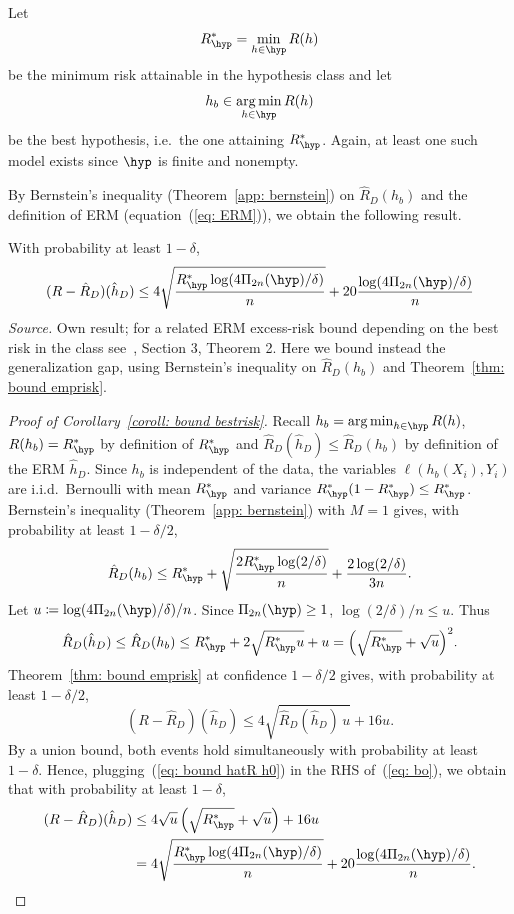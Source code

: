 \documentclass[reqno]{amsart}
\begin{document}
Let
\[
R^*_\hyp = \min_{h\in\hyp} R(h)
\]
be the minimum risk attainable in the hypothesis class
and let \[
h_b \in \argmin_{h\in\hyp} R(h)
\]
be the best hypothesis, i.e.\ the one attaining $R^*_\hyp$. Again, at least one such model exists since $\hyp$ is finite and nonempty. 

By Bernstein's inequality (Theorem~\ref{app: bernstein}) on $\hat R_D(h_b)$ and the definition of ERM (equation~(\ref{eq: ERM})), we obtain the following result. 

\begin{corollary}\label{coroll: bound bestrisk}
    With probability at least $1-\delta$,
    \[
    (R - \hat R_D)(\hat h_D) \le 4\sqrt{\frac{R^*_{\hyp}\log(4\Pi_{2n}(\hyp)/\delta)}{n}} + 20\frac{\log(4\Pi_{2n}(\hyp)/\delta)}{n}
    \]
\textnormal{\emph{Source.} Own result; for a related ERM excess-risk bound depending on the best risk in the class see~\cite{bartlett1999inequality}, Section 3, Theorem 2. Here we bound instead the generalization gap, using Bernstein's inequality on $\hat R_D(h_b)$ and Theorem~\ref{thm: bound emprisk}.}

\begin{proof}[Proof of Corollary~\ref{coroll: bound bestrisk}]
        Recall $h_b = \argmin_{h\in\hyp} R(h)$, $R(h_b) = R^*_{\hyp}$ by definition of $R^*_\hyp$ and $\hat R_D(\hat h_D) \le \hat R_D(h_b)$ by definition of the ERM $\hat h_D$.
        Since $h_b$ is independent of the data, the variables $\ell(h_b(X_i),Y_i)$ are i.i.d.\ Bernoulli with mean $R^*_\hyp$ and variance $R^*_\hyp(1-R^*_\hyp) \le R^*_\hyp$. Bernstein's inequality (Theorem~\ref{app: bernstein}) with $M=1$ gives, with probability at least $1-\delta/2$,
        \[
        \hat R_D(h_b) \le R^*_{\hyp} + \sqrt{\frac{2R^*_\hyp \log (2/\delta)}{n}} + \frac{2\log(2/\delta)}{3n}.
        \]
        Let $u\coloneq\log(4\Pi_{2n}(\hyp)/\delta)/n$. Since $\Pi_{2n}(\hyp)\ge 1$, $\log(2/\delta)/n\le u$. Thus
        \begin{equation}\label{eq: bound hatR h0}
        \hat R_D(\hat h_D) \le \hat R_D(h_b) \le R^*_\hyp + 2\sqrt{R^*_\hyp u} + u = {\left(\sqrt{R^*_\hyp} + \sqrt{u}\right)}^2.
        \end{equation}
        Theorem~\ref{thm: bound emprisk} at confidence $1-\delta/2$ gives, with probability at least $1-\delta/2$,
        \begin{equation}\label{eq: bo}
        (R-\hat R_D)(\hat h_D) \le 4\sqrt{\hat R_D(\hat h_D)\,u} + 16u.
        \end{equation}
        By a union bound, both events hold simultaneously with probability at least $1-\delta$. Hence, plugging~(\ref{eq: bound hatR h0}) in the RHS of~(\ref{eq: bo}), we obtain that with probability at least $1-\delta$,
        \begin{align*}
        (R-\hat R_D)(\hat h_D) &\le 4\sqrt u\left(\sqrt{R^*_\hyp} + \sqrt u\right) + 16u \\
        &= 4\sqrt{\frac{R^*_{\hyp}\log(4\Pi_{2n}(\hyp)/\delta)}{n}} + 20\frac{\log(4\Pi_{2n}(\hyp)/\delta)}{n}.
        \end{align*}
\end{proof}
\end{corollary}
\end{document}

